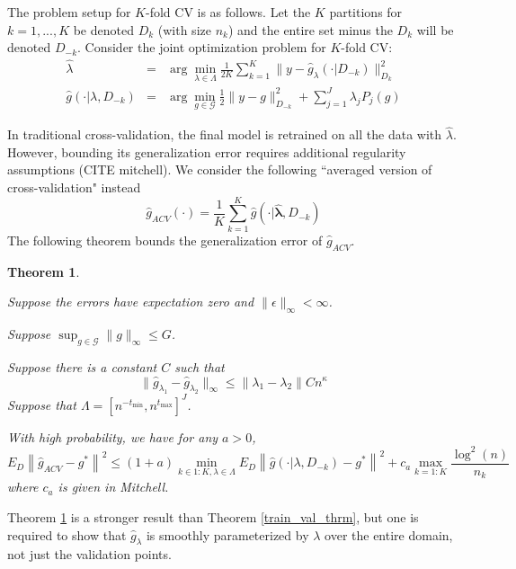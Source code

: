 \documentclass[12pt]{article}
\newtheorem{theorem}{Theorem}
\begin{document}
The problem setup for $K$-fold CV is as follows. Let the $K$ partitions for $k=1,...,K$ be denoted $D_k$ (with size $n_k$) and the entire set minus the $D_k$ will be denoted $D_{-k}$. Consider the joint optimization problem for $K$-fold CV:
\begin{eqnarray}
\label{kfold_opt}
\hat{\lambda} &=& \arg\min_{\lambda\in\Lambda} \frac{1}{2K} \sum_{k=1}^K  \| y-\hat{g}_{\lambda}(\cdot| D_{-k}) \|_{D_k}^{2} \\
\hat{g}(\cdot | \lambda, D_{-k})&=&\arg\min_{g\in\mathcal{G}} \frac{1}{2} \| y-g \|_{D_{-k}}^{2} + \sum_{j=1}^J \lambda_j P_j(g)
\end{eqnarray}

In traditional cross-validation, the final model is retrained on all the data with $\hat{\lambda}$. However, bounding its generalization error requires additional regularity assumptions (CITE mitchell). We consider the following ``averaged version of cross-validation" instead
\begin{equation}
\hat{g}_{ACV}(\cdot) = \frac{1}{K} \sum_{k=1}^K \hat{g}(\cdot | \hat{\boldsymbol \lambda}, D_{-k})
\end{equation}
The following theorem bounds the generalization error of $\hat{g}_{ACV}$.

\begin{theorem}
\label{kfold_thrm}

Suppose the errors have expectation zero and $\| \epsilon \|_\infty < \infty $.

Suppose $\sup_{g \in \mathcal{G}} \|g\|_\infty \le G$.

Suppose there is a constant $C$ such that
\begin{equation}
\| \hat{g}_{\lambda_1} - \hat{g}_{\lambda_2} \|_\infty \le \| \lambda_1 - \lambda_2 \| C n^\kappa
\end{equation}
Suppose that $\Lambda = [ n^{-t_{\min}}, n^{t_{\max}} ]^J $.


With high probability, we have for any $a > 0$,
\begin{equation}
\label{smooth_error_bound}
E_{D} \left \| \hat{g}_{ACV} - g^* \right \|^2 \le
(1+a) \min_{k\in 1:K, \lambda \in \Lambda}  E_{D} \left \| \hat{g}(\cdot |\lambda, D_{-k}) - g^* \right \|^2
+ c_a \max_{k=1:K} \frac{\log^2(n)}{n_k}
\end{equation}
where $c_a$ is given in Mitchell.
\end{theorem}


Theorem \ref{kfold_thrm} is a stronger result than Theorem \ref{train_val_thrm}, but one is required to show that $\hat{g}_\lambda$ is smoothly parameterized by $\lambda$ over the entire domain, not just the validation points.
\end{document}
